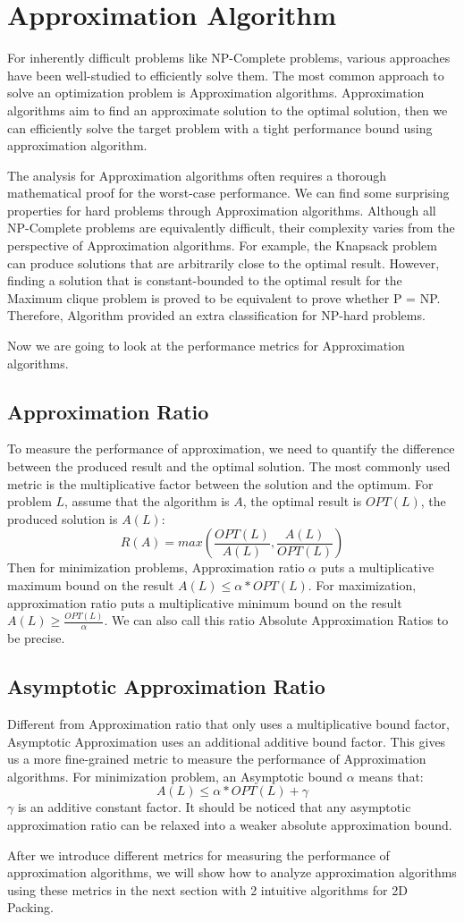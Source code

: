 \documentclass[sigplan,screen,nonacm]{acmart}\settopmatter{printfolios=true,printccs=false,printacmref=false}
\begin{document}
\section{Approximation Algorithm}
For inherently difficult problems like NP-Complete problems, various approaches have been well-studied to efficiently solve them. The most common approach to solve an optimization problem is Approximation algorithms. Approximation algorithms aim to find an approximate solution to the optimal solution, then we can efficiently solve the target problem with a tight performance bound using approximation algorithm.\par
The analysis for Approximation algorithms often requires a thorough mathematical proof for the worst-case performance. We can find some surprising properties for hard problems through Approximation algorithms. Although all NP-Complete problems are equivalently difficult, their complexity varies from the perspective of Approximation algorithms. For example, the Knapsack problem can produce solutions that are arbitrarily close to the optimal result. However, finding a solution that is constant-bounded to the optimal result for the Maximum clique problem is proved to be equivalent to prove whether P = NP. Therefore, Algorithm provided an extra classification for NP-hard problems.\par
Now we are going to look at the performance metrics for Approximation algorithms.
\subsection{Approximation Ratio}
To measure the performance of approximation, we need to quantify the difference between the produced result and the optimal solution. The most commonly used metric is the multiplicative factor between the solution and the optimum. For problem $L$, assume that the algorithm is $A$, the optimal result is $OPT(L)$, the produced solution is $A(L)$:
$$R(A) = max(\frac{OPT(L)}{A(L)}, \frac{A(L)}{OPT(L)})$$
Then for minimization problems, Approximation ratio $\alpha$ puts a multiplicative maximum bound on the result $A(L) \leq \alpha*OPT(L)$. For maximization, approximation ratio puts a multiplicative minimum bound on the result $A(L) \geq \frac{OPT(L)}{\alpha}$. We can also call this ratio Absolute Approximation Ratios to be precise.
\subsection{Asymptotic Approximation Ratio}
Different from Approximation ratio that only uses a multiplicative bound factor, Asymptotic Approximation uses an additional additive bound factor. This gives us a more fine-grained metric to measure the performance of Approximation algorithms. For minimization problem, an Asymptotic bound $\alpha$ means that:
$$ A(L) \leq \alpha*OPT(L) + \gamma $$
$\gamma$ is an additive constant factor. It should be noticed that any asymptotic approximation ratio can be relaxed into a weaker absolute approximation bound.\par
After we introduce different metrics for measuring the performance of approximation algorithms, we will show how to analyze approximation algorithms using these metrics in the next section with 2 intuitive algorithms for 2D Packing.
\end{document}
